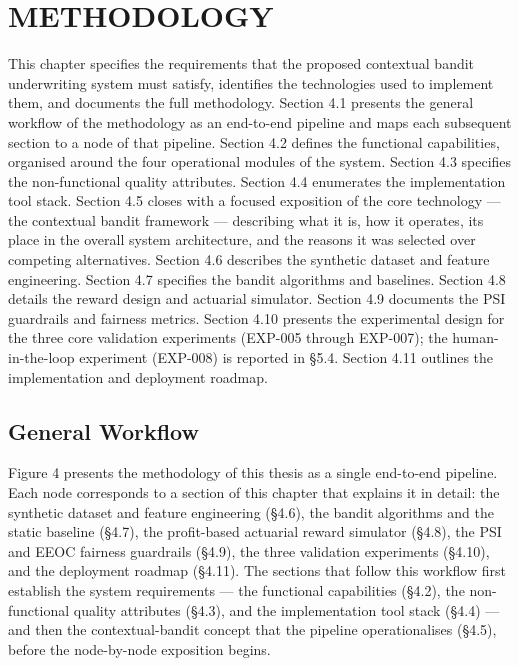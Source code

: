 \chapter{METHODOLOGY}\label{chapter-iv.-project-analysis-and-concepts}

This chapter specifies the requirements that the proposed contextual bandit underwriting system must satisfy, identifies the technologies used to implement them, and documents the full methodology. Section 4.1 presents the general workflow of the methodology as an end-to-end pipeline and maps each subsequent section to a node of that pipeline. Section 4.2 defines the functional capabilities, organised around the four operational modules of the system. Section 4.3 specifies the non-functional quality attributes. Section 4.4 enumerates the implementation tool stack. Section 4.5 closes with a focused exposition of the core technology --- the contextual bandit framework --- describing what it is, how it operates, its place in the overall system architecture, and the reasons it was selected over competing alternatives. Section 4.6 describes the synthetic dataset and feature engineering. Section 4.7 specifies the bandit algorithms and baselines. Section 4.8 details the reward design and actuarial simulator. Section 4.9 documents the PSI guardrails and fairness metrics. Section 4.10 presents the experimental design for the three core validation experiments (EXP-005 through EXP-007); the human-in-the-loop experiment (EXP-008) is reported in §5.4. Section 4.11 outlines the implementation and deployment roadmap.

\section{General Workflow}\label{general-workflow}

Figure 4 presents the methodology of this thesis as a single end-to-end pipeline. Each node corresponds to a section of this chapter that explains it in detail: the synthetic dataset and feature engineering (\S4.6), the bandit algorithms and the static baseline (\S4.7), the profit-based actuarial reward simulator (\S4.8), the PSI and EEOC fairness guardrails (\S4.9), the three validation experiments (\S4.10), and the deployment roadmap (\S4.11). The sections that follow this workflow first establish the system requirements --- the functional capabilities (\S4.2), the non-functional quality attributes (\S4.3), and the implementation tool stack (\S4.4) --- and then the contextual-bandit concept that the pipeline operationalises (\S4.5), before the node-by-node exposition begins.

